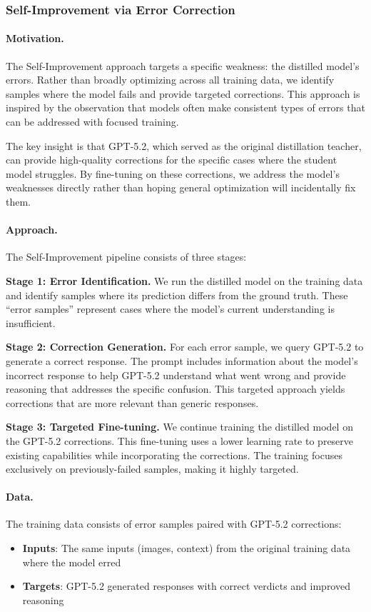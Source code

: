 \documentclass[11pt,a4paper]{article}
\begin{document}
\subsubsection{Self-Improvement via Error Correction}

\paragraph{Motivation.} The Self-Improvement approach targets a specific weakness: the distilled model's errors. Rather than broadly optimizing across all training data, we identify samples where the model fails and provide targeted corrections. This approach is inspired by the observation that models often make consistent types of errors that can be addressed with focused training.

The key insight is that GPT-5.2, which served as the original distillation teacher, can provide high-quality corrections for the specific cases where the student model struggles. By fine-tuning on these corrections, we address the model's weaknesses directly rather than hoping general optimization will incidentally fix them.

\paragraph{Approach.} The Self-Improvement pipeline consists of three stages:

\textbf{Stage 1: Error Identification.} We run the distilled model on the training data and identify samples where its prediction differs from the ground truth. These ``error samples'' represent cases where the model's current understanding is insufficient.

\textbf{Stage 2: Correction Generation.} For each error sample, we query GPT-5.2 to generate a correct response. The prompt includes information about the model's incorrect response to help GPT-5.2 understand what went wrong and provide reasoning that addresses the specific confusion. This targeted approach yields corrections that are more relevant than generic responses.

\textbf{Stage 3: Targeted Fine-tuning.} We continue training the distilled model on the GPT-5.2 corrections. This fine-tuning uses a lower learning rate to preserve existing capabilities while incorporating the corrections. The training focuses exclusively on previously-failed samples, making it highly targeted.

\paragraph{Data.} The training data consists of error samples paired with GPT-5.2 corrections:
\begin{itemize}
    \item \textbf{Inputs}: The same inputs (images, context) from the original training data where the model erred
    \item \textbf{Targets}: GPT-5.2 generated responses with correct verdicts and improved reasoning
\end{itemize}
\end{document}
